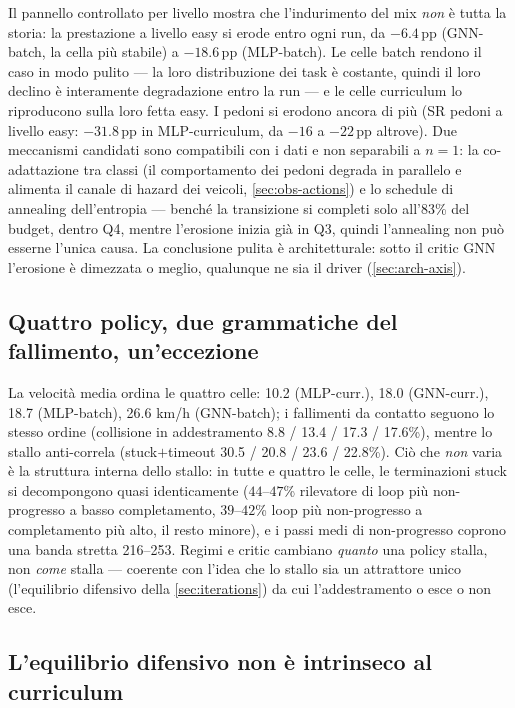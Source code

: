 Il pannello controllato per livello mostra che l'indurimento del mix
\emph{non} è tutta la storia: la prestazione a livello easy si erode
entro ogni run, da $-6.4$\,pp (GNN-batch, la cella più stabile) a
$-18.6$\,pp (MLP-batch). Le celle batch rendono il caso in modo pulito
--- la loro distribuzione dei task è costante, quindi il loro declino è
interamente degradazione entro la run --- e le celle curriculum lo
riproducono sulla loro fetta easy. I pedoni si erodono ancora di più
(SR pedoni a livello easy: $-31.8$\,pp in MLP-curriculum, da $-16$ a
$-22$\,pp altrove). Due meccanismi candidati sono compatibili con i
dati e non separabili a $n{=}1$: la co-adattazione tra classi (il
comportamento dei pedoni degrada in parallelo e alimenta il canale di
hazard dei veicoli, \cref{sec:obs-actions}) e lo schedule di annealing
dell'entropia --- benché la transizione si completi solo all'83\% del
budget, dentro Q4, mentre l'erosione inizia già in Q3, quindi
l'annealing non può esserne l'unica causa. La conclusione pulita è
architetturale: sotto il critic GNN l'erosione è dimezzata o meglio,
qualunque ne sia il driver (\cref{sec:arch-axis}).

\subsection{Quattro policy, due grammatiche del fallimento, un'eccezione}
\label{sec:failure-grammars}

La velocità media ordina le quattro celle: 10.2 (MLP-curr.), 18.0
(GNN-curr.), 18.7 (MLP-batch), 26.6 km/h (GNN-batch); i fallimenti da
contatto seguono lo stesso ordine (collisione in addestramento 8.8 /
13.4 / 17.3 / 17.6\%), mentre lo stallo anti-correla (stuck$+$timeout
30.5 / 20.8 / 23.6 / 22.8\%). Ciò che \emph{non} varia è la struttura
interna dello stallo: in tutte e quattro le celle, le terminazioni
stuck si decompongono quasi identicamente ($44$--$47$\% rilevatore di
loop più non-progresso a basso completamento, $39$--$42$\% loop più
non-progresso a completamento più alto, il resto minore), e i passi
medi di non-progresso coprono una banda stretta 216--253. Regimi e
critic cambiano \emph{quanto} una policy stalla, non \emph{come} stalla
--- coerente con l'idea che lo stallo sia un attrattore unico
(l'equilibrio difensivo della \cref{sec:iterations}) da cui
l'addestramento o esce o non esce.

\subsection{L'equilibrio difensivo non è intrinseco al curriculum}
\label{sec:defensive-case}

